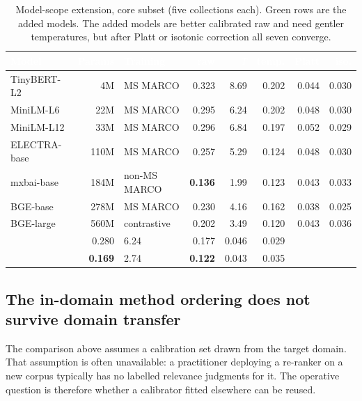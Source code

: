\documentclass[sn-mathphys-num,pdflatex]{sn-jnl}
\newcommand{\thead}[1]{\textcolor{white}{\textbf{#1}}}
\begin{document}
\begin{table}[t]
\centering
\caption{Model-scope extension, core subset (five collections each).
\textcolor{green!50!black}{Green} rows are the added models. The added models are
better calibrated raw and need gentler temperatures, but after Platt or isotonic
correction all seven converge.}\label{tab:modelscope}
\small
\begin{tabular}{lrlrrrrr}
\toprule
\rowcolor{headblue}
\thead{Model} & \thead{Params} & \thead{Training} & \thead{raw} & \thead{$T$} & \thead{temp.} & \thead{Platt} & \thead{iso.} \\
\midrule
\rowcolor{rowlight}
TinyBERT-L2  &    4M & MS MARCO     & 0.323 & 8.69 & 0.202 & 0.044 & 0.030 \\
\rowcolor{rowwhite}
MiniLM-L6    &   22M & MS MARCO     & 0.295 & 6.24 & 0.202 & 0.048 & 0.030 \\
\rowcolor{rowlight}
MiniLM-L12   &   33M & MS MARCO     & 0.296 & 6.84 & 0.197 & 0.052 & 0.029 \\
\rowcolor{rowwhite}
ELECTRA-base &  110M & MS MARCO     & 0.257 & 5.29 & 0.124 & 0.048 & 0.030 \\
\rowcolor{cleangreen}
mxbai-base   &  184M & non-MS MARCO & \textbf{0.136} & 1.99 & 0.123 & 0.043 & 0.033 \\
\rowcolor{rowlight}
BGE-base     &  278M & MS MARCO     & 0.230 & 4.16 & 0.162 & 0.038 & 0.025 \\
\rowcolor{cleangreen}
BGE-large    &  560M & contrastive  & 0.202 & 3.49 & 0.120 & 0.043 & 0.036 \\
\midrule
\rowcolor{rowwhite}
\multicolumn{3}{l}{\textit{Original five (mean)}}   & 0.280 & 6.24 & 0.177 & 0.046 & 0.029 \\
\rowcolor{bestcell}
\multicolumn{3}{l}{\textit{Extension two (mean)}}   & \textbf{0.169} & 2.74 & \textbf{0.122} & 0.043 & 0.035 \\
\bottomrule
\end{tabular}
\end{table}

\subsection{The in-domain method ordering does not survive domain transfer}\label{sec:transfer}
The comparison above assumes a calibration set drawn from the target domain. That
assumption is often unavailable: a practitioner deploying a re-ranker on a new
corpus typically has no labelled relevance judgments for it. The operative question
is therefore whether a calibrator fitted elsewhere can be reused.
\end{document}
